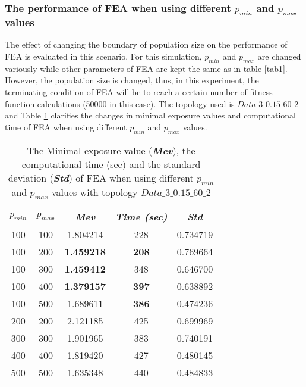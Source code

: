 \documentclass[final]{elsarticle}
\begin{document}
\subsubsection{The performance of FEA when using different $ p_{min} $ and $ p_{max} $ values}
The effect of changing the boundary of population size on the performance of FEA is evaluated in this scenario. For this simulation, $ p_{min} $ and $ p_{max} $ are changed variously while other parameters of FEA are kept the same as in table \ref{tab1}. However, the population size is changed, thus, in this experiment, the terminating condition of FEA will be to reach a certain number of fitness-function-calculations (50000 in this case). The topology used is $ Data\_3\_0.15\_60\_2 $ and Table \ref{tab2} clarifies the changes in minimal exposure values and computational time of FEA when using different $ p_{min} $ and $ p_{max} $ values.
\begin{table}
	\caption{The Minimal exposure value (\textbf{\textit{Mev}}), the computational time (sec) and the standard deviation (\textbf{\textit{Std}}) of FEA when using different $ p_{min} $ and $ p_{max} $ values with topology $ Data\_3\_0.15\_60\_2 $  }
	\label{tab2}       %
	\begin{center}
		\renewcommand{\arraystretch}{1.5}
		\begin{tabular}{|c|c|c|c|c|}
			\hline
			\textbf{$p_{min}$} & \textbf{$p_{max}$ } & \textit{\textbf{Mev}} &\textit{ \textbf{Time (sec)}} & \textit{\textbf{Std}} \\
			\hline
			100 & 100 &1.804214 &228 &0.734719\\
			\hline
			100 & 200 &\textbf{1.459218} &\textbf{208} &0.769664\\
			\hline
			100 & 300 &\textbf{1.459412} &348 &0.646700\\
			\hline
			100 & 400 &\textbf{1.379157} &\textbf{397} &0.638892\\
			\hline
			100 & 500 &1.689611 &\textbf{386} &0.474236\\
			\hline\hline
			200 & 200 &2.121185 &425 &0.699969\\\hline
			300 & 300 &1.901965 &383 &0.740191\\\hline
			400 & 400 &1.819420 &427 &0.480145\\\hline
			500 & 500 &1.635348 &440 &0.484833\\\hline
		\end{tabular}
	\end{center}
\end{table}
\end{document}
